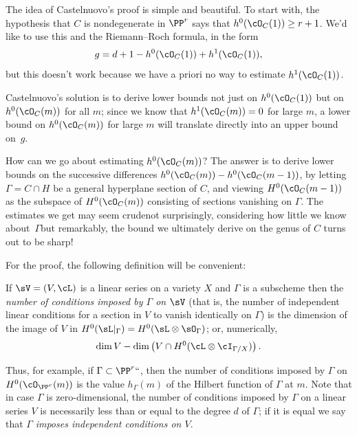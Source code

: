 The idea of Castelnuovo's proof is simple and beautiful. To start
with, the hypothesis that $C$ is nondegenerate in $\PP^r$ says that
$h^0(\cO_C(1)) \geq r+1$. We'd like to use this and the Riemann--Roch
formula, in the form
$$
g = d+1 - h^0(\cO_C(1)) + h^1(\cO_C(1)),
$$
but this doesn't work because we have a priori no way to estimate
$h^1(\cO_C(1))$.

Castelnuovo's solution  is to derive lower bounds not just on
$h^0(\cO_C(1))$ but on $h^0(\cO_C(m))$ for all $m$; since we know that
$h^1(\cO_C(m)) = 0$ for large $m$, a lower bound on $h^0(\cO_C(m))$
for large $m$ will translate directly into an upper bound on~$g$.

How can we go about estimating $h^0(\cO_C(m))$? The answer is to
derive lower bounds on the successive differences $h^0(\cO_C(m)) -
h^0(\cO_C(m-1))$, by letting $\Gamma = C \cap H$ be a general hyperplane
section of $C$, and viewing $H^0(\cO_C(m-1))$ as the subspace of
$H^0(\cO_C(m))$ consisting of sections vanishing on $\Gamma$. The
estimates we get may seem crude\emdash not surprisingly, considering
how little we know about~$\Gamma$\emdash but remarkably, the bound we
ultimately derive on the genus of $C$ turns out to be sharp!

For the proof, the following definition will be convenient:

\begin{definition}
If $\sV = (V,\cL)$ is a linear series on a variety $X$ and $\Gamma$
is a subscheme then the \emph{number of conditions imposed by $\Gamma$
on $\sV$} (that is, the number of
independent linear conditions
%
for a
section in $V$ to vanish
identically on $\Gamma$) is the dimension of the image of $V$ in
$H^0(\sL|_\Gamma) = H^0(\sL \otimes \sO_\Gamma)$; or, numerically,
$$
\dim V - \dim \left(V \cap H^0(\cL\otimes \cI_{\Gamma/X}) \right).
$$
\end{definition}

Thus, for example, if $\Gamma \subset \PP^r` `$, then the number of
conditions imposed by $\Gamma$ on $H^0(\cO_{\PP^r}(m))$ is the value
$h_\Gamma(m)$ of the Hilbert function of $\Gamma$ at $m$.
Note that in case $\Gamma$ is zero-dimensional, the number of conditions
imposed by $\Gamma$ on a linear series $V$ is necessarily less than or
equal to the degree $d$ of $\Gamma$; if it is equal we say that $\Gamma$
\emph{imposes independent conditions on $V$}.

